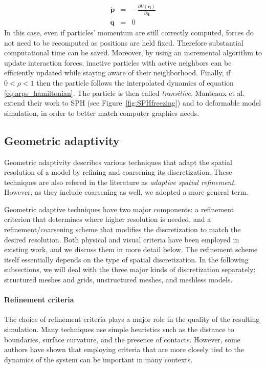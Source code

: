 \begin{equation}
\label{eq:no_motion}
\begin{array}{lll}
    \displaystyle \dot{\mathbf{p}} & = & \displaystyle - \frac{\partial V(\mathbf{q})}{\partial \mathbf{q}} \\
    \displaystyle \dot{\mathbf{q}} & = & 0
\end{array}
\end{equation}
In this case, even if particles' momentum are still correctly computed, forces do not need to be recomputed as positions are held fixed. Therefore substantial computational time can be saved. Moreover, by using an incremental algorithm to update interaction forces, inactive particles with active neighbors can be efficiently updated while staying aware of their neighborhood.
Finally, if $0<\rho<1$ then the particle follows the interpolated dynamics of equation \eqref{eq:arps_hamiltonian}. The particle is then called \emph{transitive}.
Manteaux et al. \cite{Manteaux2013} extend their work to SPH (see Figure~\ref{fig:SPHfreezing}) and to deformable model simulation, in order to better match computer graphics needs.

\subsection{Geometric adaptivity} \label{sec h adaptivity}
\label{sec:spatial_refinement}

Geometric adaptivity describes various techniques that adapt the spatial resolution of a model by refining and coarsening its discretization. These techniques are also refered in the literature as \emph{adaptive spatial refinement}. However, as they include coarsening as well, we adopted a more general term.

Geometric adaptive techniques have two major components: a refinement criterion that determines where higher resolution is needed, and a refinement/coarsening scheme that modifies the discretization to match the desired resolution.
Both physical and visual criteria have been employed in existing work, and we discuss them in more detail below.
The refinement scheme itself essentially depends on the type of spatial discretization.
In the following subsections, we will deal with the three major kinds of discretization separately: structured meshes and grids, unstructured meshes, and meshless models.


\paragraph*{Refinement criteria}
The choice of refinement criteria plays a major role in the quality of the resulting simulation.
Many techniques use simple heuristics such as the distance to boundaries, surface curvature, and the presence of contacts.
However, some authors have shown that employing criteria that are more closely tied to the dynamics of the system can be important in many contexts.

